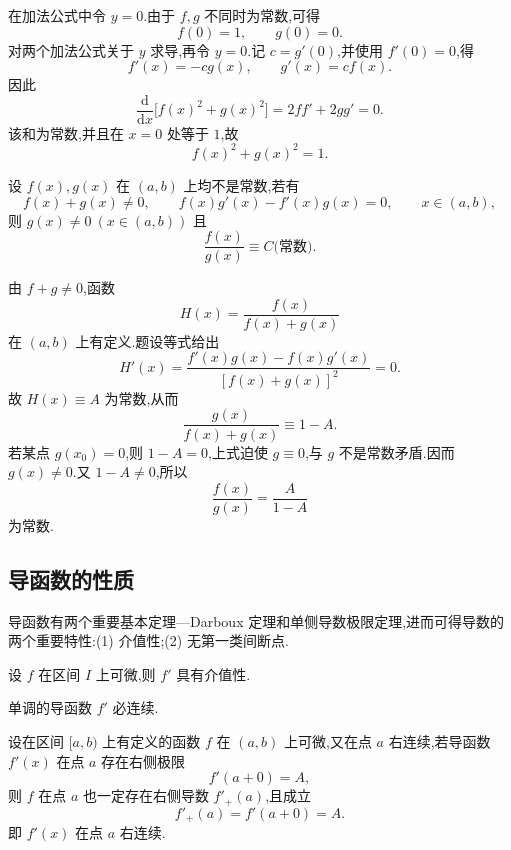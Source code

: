 \begin{solution}
    在加法公式中令 $y=0$.由于 $f,g$ 不同时为常数,可得
    \[
        f(0)=1,
        \qquad
        g(0)=0.
    \]
    对两个加法公式关于 $y$ 求导,再令 $y=0$.记 $c=g'(0)$,并使用 $f'(0)=0$,得
    \[
        f'(x)=-c g(x),
        \qquad
        g'(x)=c f(x).
    \]
    因此
    \[
        \dfrac{\mathrm{d}}{\mathrm{d}x}\bigl[f(x)^2+g(x)^2\bigr]
        =2ff'+2gg'=0.
    \]
    该和为常数,并且在 $x=0$ 处等于 $1$,故
    \[
        f(x)^2+g(x)^2=1.
    \]
\end{solution}

\begin{example}
    设 $f(x),g(x)$ 在 $(a,b)$ 上均不是常数,若有
    \[
        f(x)+g(x)\neq0,
        \qquad
        f(x)g'(x)-f'(x)g(x)=0,
        \qquad x\in(a,b),
    \]
    则 $g(x)\neq0\ (x\in(a,b))$ 且
    \[
        \dfrac{f(x)}{g(x)}\equiv C\text{(常数)}.
    \]
\end{example}
\exampleblank

\begin{solution}
    由 $f+g\neq0$,函数
    \[
        H(x)=\dfrac{f(x)}{f(x)+g(x)}
    \]
    在 $(a,b)$ 上有定义.题设等式给出
    \[
        H'(x)=\dfrac{f'(x)g(x)-f(x)g'(x)}{[f(x)+g(x)]^2}=0.
    \]
    故 $H(x)\equiv A$ 为常数,从而
    \[
        \dfrac{g(x)}{f(x)+g(x)}\equiv1-A.
    \]
    若某点 $g(x_0)=0$,则 $1-A=0$,上式迫使 $g\equiv0$,与 $g$ 不是常数矛盾.因而 $g(x)\neq0$.又 $1-A\neq0$,所以
    \[
        \dfrac{f(x)}{g(x)}
        =\dfrac{A}{1-A}
    \]
    为常数.
\end{solution}



\subsection{导函数的性质}

导函数有两个重要基本定理---Darboux 定理和单侧导数极限定理,进而可得导数的两个重要特性:(1) 介值性;(2) 无第一类间断点.

\begin{theorem}
    设 $f$ 在区间 $I$ 上可微,则 $f'$ 具有介值性.
\end{theorem}

\begin{corollary}[\markstar]
    单调的导函数 $f'$ 必连续.
\end{corollary}

\begin{theorem}
    设在区间 $\lbrack a,b)$ 上有定义的函数 $f$ 在 $(a,b)$ 上可微,又在点 $a$ 右连续,若导函数 $f'(x)$ 在点 $a$ 存在右侧极限
    \[
        f'(a+0)=A,
    \]
    则 $f$ 在点 $a$ 也一定存在右侧导数 $f'_+(a)$,且成立
    \[
        f'_+(a)=f'(a+0)=A.
    \]
    即 $f'(x)$ 在点 $a$ 右连续.
\end{theorem}

